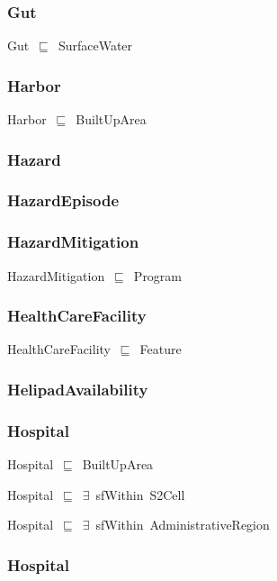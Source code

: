 \documentclass{article}
\begin{document}
\subsubsection*{Gut}

Gut~\ensuremath{\sqsubseteq}~SurfaceWater~

\subsubsection*{Harbor}

Harbor~\ensuremath{\sqsubseteq}~BuiltUpArea~

\subsubsection*{Hazard}

\subsubsection*{HazardEpisode}

\subsubsection*{HazardMitigation}

HazardMitigation~\ensuremath{\sqsubseteq}~Program~

\subsubsection*{HealthCareFacility}

HealthCareFacility~\ensuremath{\sqsubseteq}~Feature~

\subsubsection*{HelipadAvailability}

\subsubsection*{Hospital}

Hospital~\ensuremath{\sqsubseteq}~BuiltUpArea~

Hospital~\ensuremath{\sqsubseteq}~\ensuremath{\exists}~sfWithin~S2Cell~

Hospital~\ensuremath{\sqsubseteq}~\ensuremath{\exists}~sfWithin~AdministrativeRegion~

\subsubsection*{Hospital}
\end{document}

